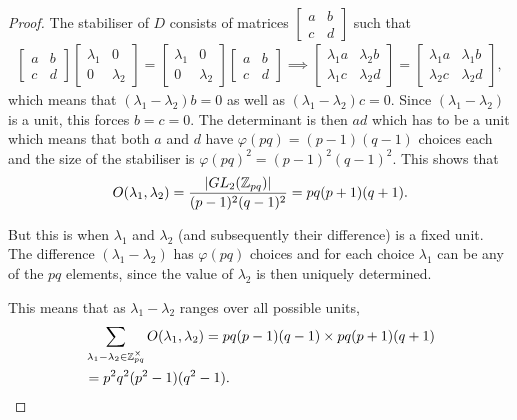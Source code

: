 \documentclass[11pt, titlepage, a4paper]{article}
\begin{document}
\begin{proof}
 The stabiliser of $D$ consists of matrices $\begin{bmatrix}
a & b \\
 c & d
\end{bmatrix}$ such that 
\begin{align*}
 \begin{bmatrix}
a & b \\
 c & d
\end{bmatrix}\begin{bmatrix}
 \lambda_{1} & 0 \\
 0 & \lambda_{2}
\end{bmatrix} =\begin{bmatrix}
 \lambda_{1} & 0 \\
 0 & \lambda_{2}
\end{bmatrix} \begin{bmatrix}
a & b \\
 c & d
\end{bmatrix} \implies  \begin{bmatrix}
\lambda_{1}a & \lambda_{2}b \\
 \lambda_{1}c & \lambda_{2}d
\end{bmatrix}= \begin{bmatrix}
\lambda_{1}a & \lambda_{1}b \\
 \lambda_{2}c & \lambda_{2}d
\end{bmatrix},
\end{align*}
which means that $(\lambda_{1}-\lambda_{2})b = 0$ as well as $(\lambda_{1}-\lambda_{2})c= 0.$ Since $(\lambda_{1}-\lambda_{2})$ is a unit, this forces $b=c=0.$ The determinant is then $ad$ which has to be a unit which means that both $a$ and $d$ have $\varphi(pq)=(p-1)(q-1)$ choices each and the size of the stabiliser is $\varphi(pq)^{2}=(p-1)^{2}(q-1)^{2}.$ This shows that
\begin{align*}
 O(\lambda_{1},\lambda_{2}) = \frac{|GL_{2}(\mathbb{Z}_{pq})|}{(p-1)^{2}(q-1)^{2}}= pq(p+1)(q+1).
\end{align*}

But this is when $\lambda_{1}$ and $\lambda_{2}$ (and subsequently their difference) is a fixed unit. The difference $(\lambda_{1}-\lambda_{2})$ has $\varphi(pq)$ choices and for each choice $\lambda_{1}$ can be any of the $pq$ elements, since the value of $\lambda_{2}$ is then uniquely determined. 

This means that as $\lambda_{1}-\lambda_{2}$ ranges over all possible units, 
\begin{align*}
& \sum_{\lambda_{1}-\lambda_{2} \in \mathbb{Z}_{pq}^{\times}} O(\lambda_{1},\lambda_{2}) =  pq(p-1)(q-1) \times pq(p+1)(q+1) \\ & =p^{2}q^{2}(p^{2} -1)(q^{2} - 1).
\end{align*}
\end{proof}
\end{document}
